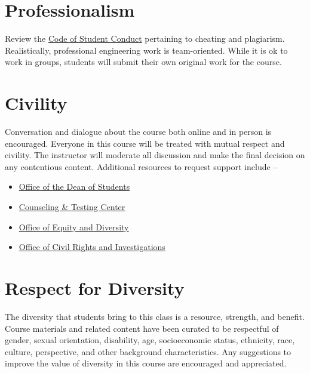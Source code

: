 \documentclass[11pt,letterpaper]{article}
\begin{document}
\section{Professionalism}
Review the \href{http://www.uidaho.edu/student-affairs/dean-of-students/student-conduct/student-code-of-conduct}{Code of Student Conduct} pertaining to cheating and plagiarism. Realistically, professional engineering work is team-oriented. While it is ok to work in groups, students will submit their own original work for the course. 


\section{Civility}
Conversation and dialogue about the course both online and in person is encouraged. Everyone in this course will be treated with mutual respect and civility. The instructor will moderate all discussion and make the final decision on any contentious content. Additional resources to request support include --
\begin{itemize}[begin-vspace=0ex,item-vspace=-0.5ex,begin-extra-vspace=1ex,para-vspace=1ex,left-margin=2.25ex,item-indent=0ex]
    \item\href{https://www.uidaho.edu/student-affairs/dean-of-students}{Office of the Dean of Students}
    \item\href{https://www.uidaho.edu/current-students/ctc/counseling}{Counseling \& Testing Center}
    \item\href{https://www.uidaho.edu/diversity/edu}{Office of Equity and Diversity}
    \item\href{https://www.uidaho.edu/ocri}{Office of Civil Rights and Investigations}
\end{itemize}


\section{Respect for Diversity}
The diversity that students bring to this class is a resource, strength, and benefit. Course materials and related content have been curated to be respectful of gender, sexual orientation, disability, age, socioeconomic status, ethnicity, race, culture, perspective, and other background characteristics. Any suggestions to improve the value of diversity in this course are encouraged and appreciated.
\end{document}
